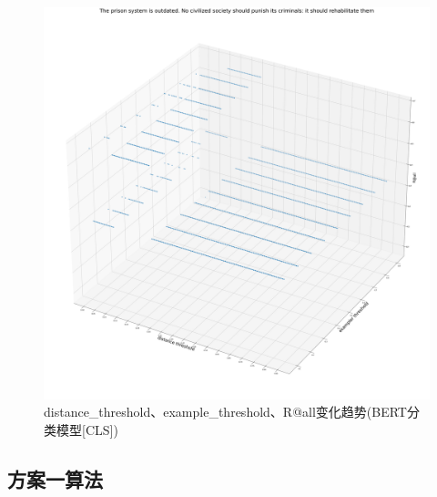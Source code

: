 \documentclass[11pt]{article}
\begin{document}
\begin{CJK}{UTF8}{gkai}
\begin{figure}[htbp]\small
  \centering
  \includegraphics[width=1.0\linewidth]{prompt_0005_R@all.png}
  \caption{distance\_threshold、example\_threshold、R@all变化趋势(BERT分类模型[CLS])}
  \label{framework}
\end{figure}

\subsection{方案一算法}


\end{CJK}
\end{document}
